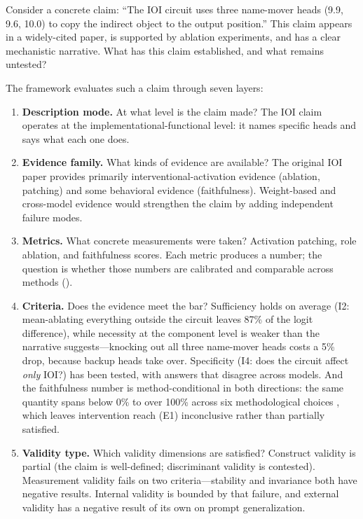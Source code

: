 \documentclass{article}
\begin{document}
Consider a concrete claim: ``The IOI circuit uses three name-mover heads (9.9, 9.6, 10.0) to copy the indirect object to the output position.'' This claim appears in a widely-cited paper, is supported by ablation experiments, and has a clear mechanistic narrative. What has this claim established, and what remains untested?

The framework evaluates such a claim through seven layers:

\begin{enumerate}[nosep]
\item \textbf{Description mode.} At what level is the claim made? The IOI claim operates at the implementational-functional level: it names specific heads and says what each one does.

\item \textbf{Evidence family.} What kinds of evidence are available? The original IOI paper provides primarily interventional-activation evidence (ablation, patching) and some behavioral evidence (faithfulness). Weight-based and cross-model evidence would strengthen the claim by adding independent failure modes.

\item \textbf{Metrics.} What concrete measurements were taken? Activation patching, role ablation, and faithfulness scores. Each metric produces a number; the question is whether those numbers are calibrated and comparable across methods ().

\item \textbf{Criteria.} Does the evidence meet the bar? Sufficiency holds on average (I2: mean-ablating everything outside the circuit leaves 87\% of the logit difference), while necessity at the component level is weaker than the narrative suggests---knocking out all three name-mover heads costs a 5\% drop, because backup heads take over. Specificity (I4: does the circuit affect \emph{only} IOI?) has been tested, with answers that disagree across models. And the faithfulness number is method-conditional in both directions: the same quantity spans below 0\% to over 100\% across six methodological choices \citep{miller2024transformer}, which leaves intervention reach (E1) inconclusive rather than partially satisfied.

\item \textbf{Validity type.} Which validity dimensions are satisfied? Construct validity is partial (the claim is well-defined; discriminant validity is contested). Measurement validity fails on two criteria---stability and invariance both have negative results. Internal validity is bounded by that failure, and external validity has a negative result of its own on prompt generalization.


\end{enumerate}
\end{document}
